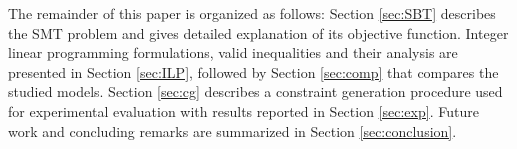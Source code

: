 The remainder of this paper is organized as follows: Section \ref{sec:SBT} describes the SMT problem and gives detailed explanation of its objective function.
Integer linear programming formulations, valid inequalities and their analysis are presented in Section \ref{sec:ILP}, followed by Section \ref{sec:comp} that compares the studied models.
Section \ref{sec:cg} describes a constraint generation procedure used for experimental evaluation with results reported in Section \ref{sec:exp}.
Future work and concluding remarks are summarized in Section \ref{sec:conclusion}.


